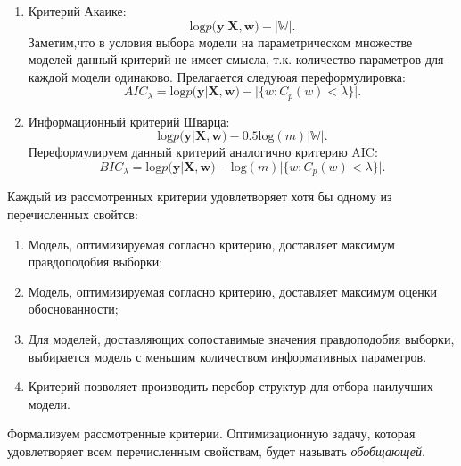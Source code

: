 \begin{enumerate}
\item Критерий Акаике:
\[
    \text{log}p(\mathbf{y}|\mathbf{X}, \mathbf{w}) - |\mathbb{W}|.
\]
Заметим,что в условия выбора модели на параметрическом множестве моделей данный критерий не имеет смысла, т.к. количество параметров для каждой модели одинаково. Прелагается следуюая переформулировка:
\[
    AIC_{\lambda} = \text{log}p(\mathbf{y}|\mathbf{X}, \mathbf{w}) - |\{w: C_p(w)<\lambda\}|.
\]

\item Информационный критерий Шварца:
\[
    \text{log}p(\mathbf{y}|\mathbf{X}, \mathbf{w}) - 0.5\text{log}(m)|\mathbb{W}|.
\]
Переформулируем данный критерий аналогично критерию AIC:
\[
    BIC_{\lambda} = \text{log}p(\mathbf{y}|\mathbf{X}, \mathbf{w}) - \text{log}(m)|\{w: C_p(w)<\lambda\}|.
\]

\end{enumerate}

Каждый из рассмотренных критерии удовлетворяет хотя бы одному из перечисленных свойтсв:
\begin{enumerate}
\item Модель, оптимизируемая согласно критерию, доставляет максимум правдоподобия выборки;
\item Модель, оптимизируемая согласно критерию, доставляет максимум оценки обоснованности;
\item Для моделей, доставляющих сопоставимые значения правдоподобия выборки, выбирается модель с меньшим количеством информативных параметров.
\item Критерий позволяет производить перебор структур для отбора наилучших модели.
\end{enumerate}

Формализуем рассмотренные критерии. Оптимизационную задачу, которая удовлетворяет всем перечисленным свойствам, будет называть \textit{обобщающей}.

